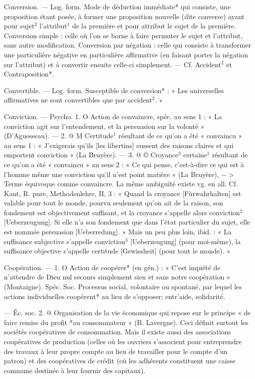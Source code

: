 Conversion. — Log. form. Mode de
déduction immédiate* qui consiste,
une proposition étant posée, à former une proposition nouvelle (dite
converse) ayant pour sujet$^2$ l'attribut$^1$ de la première et pour attribut le sujet de la première. Conversion simple : celle où l’on se borne à
faire permuter le sujet et l’attribut,
sans autre modification. Conversion
par négation : celle qui consiste à
transformer une particulière négative en particulière affirmative (en
faisant porter la négation sur l’attribut) et à convertir ensuite celle-ci
simplement. — Cf. Accident$^2$ et
Contraposition*.

Convertible. — Log. form. Susceptible de conversion* : « Les universelles
affirmatives ne sont convertibles que par accident$^2$. »

Conviction. — Psycho. 1. O Action de
convaincre, spéc. au sens 1 : « La
conviction agit sur l’entendement,
et la persuasion sur la volonté »
(D’Aguesseau). — 2. @ M Certitude$^1$
résultant de ce qu’on a été « convaincu » au sens 1 : « J’exigerais
qu'ils [les libertins] eussent des raisons claires et qui emportent conviction » (La Bruyère). — 3. @ ©
Croyance$^3$ certaine$^1$ résultant de ce
qu’on a été « convaincu » au sens 2 :
« Ce qui pense, c’est-à-dire ce qui
est à l’homme même une conviction
qu’il n’est point matière » (La
Bruyère), $->$ Terme équivoque
comme convaincre. La même ambiguïté existe vg. en all. Cf. Kant,
R. pure, Methodenlehre, II, 3 :
« Quand la croyance [Fürwahrhalten] est valable pour tout le monde,
pourvu seulement qu’on ait de la
raison, son fondement est objectivement suffisant, et la croyance
s’appelle alors conviction$^2$ [Ueberzeugung]. Si elle n’a son fondement
que dans l’état particulier du sujet,
elle est nommée persuasion [Ueberredung]. » Mais un peu plus loin, ibid. :
« La suffisance subjective s'appelle
conviction$^3$ [Ueberzeugung] (pour
moi-même), la suffisance objective
s’appelle certitude [Gewissheit] (pour
tout le monde). »

Coopération. — 1. O Action de coopérer* (en gén.) : « C’est impiété de
n'attendre de Dieu nul secours simplement sien et sans notre coopération » (Montaigne). Spéc. Soc. Processus social, volontaire ou spontané, par lequel les actions individuelles coopèrent* au lieu de s’opposer; entr’aide, solidarité.

— Éc. soc. 2. @ Organisation de
la vie économique qui repose sur le
principe « de faire remise du profit
*au consommateur » (B. Lavergne).
Ceci définit surtout les sociétés
coopératives de consommation. Mais
il existe aussi des associations coopératives de production (celles où les
ouvriers s'associent pour entreprendre des travaux à leur propre
compte au lieu de travailler pour le
compte d'un patron) et des coopératives de crédit (où les adhérents
constituent une caisse commune
destinée à leur fournir des capitaux).


